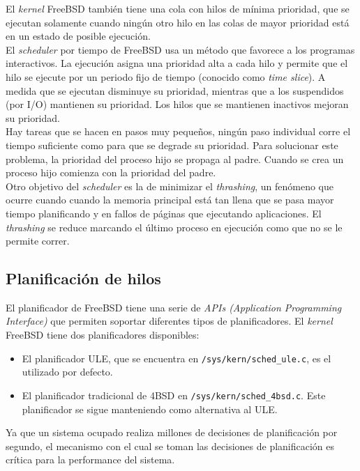 \documentclass[a4paper]{book}
\begin{document}
El \emph{kernel} FreeBSD también tiene una cola con hilos de mínima prioridad, que se ejecutan solamente cuando ningún otro hilo en las colas de mayor prioridad está en un estado de posible ejecución.\\

El \emph{scheduler} por tiempo de FreeBSD usa un método que favorece a los programas interactivos. La ejecución asigna una prioridad alta a cada hilo y permite que el hilo se ejecute por un periodo fijo de tiempo (conocido como \emph{time slice}). A medida que se ejecutan disminuye su prioridad, mientras que a los suspendidos (por I/O) mantienen su prioridad. Los hilos que se mantienen inactivos mejoran su prioridad.\\

Hay tareas que se hacen en pasos muy pequeños, ningún paso individual corre el tiempo suficiente como para que se degrade su prioridad. Para solucionar este problema, la prioridad del proceso hijo se propaga al padre. Cuando se crea un proceso hijo comienza con la prioridad del padre.\\

Otro objetivo del \emph{scheduler} es la de minimizar el \emph{thrashing}, un fenómeno que ocurre cuando cuando la memoria principal está tan llena que se pasa mayor tiempo planificando y en fallos de páginas que ejecutando aplicaciones. El \emph{thrashing} se reduce marcando el último proceso en ejecución como que no se le permite correr.

\subsection{Planificaci\'on de hilos}

El planificador de FreeBSD tiene una serie de \emph{APIs (Application Programming Interface)} que permiten soportar diferentes tipos de planificadores.
El \emph{kernel} FreeBSD tiene dos planificadores disponibles:
\begin{itemize}
\item El planificador ULE, que se encuentra en \verb|/sys/kern/sched_ule.c|, es el utilizado por defecto.
\item El planificador tradicional de 4BSD en \verb|/sys/kern/sched_4bsd.c|. Este planificador se sigue manteniendo como alternativa al ULE.
\end{itemize}

Ya que un sistema ocupado realiza millones de decisiones de planificación por segundo, el mecanismo con el cual se toman las decisiones de planificación es crítica para la performance del sistema.\\
\end{document}
